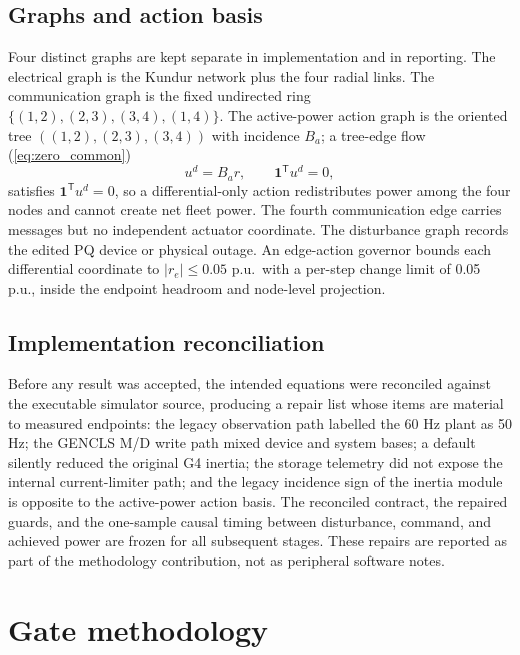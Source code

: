 \documentclass[journal]{IEEEtran}
\begin{document}
\subsection{Graphs and action basis}
\label{sec:graphs}

Four distinct graphs are kept separate in implementation and in reporting. The electrical graph is the Kundur network plus the four radial links. The communication graph is the fixed undirected ring $\{(1,2),(2,3),(3,4),(1,4)\}$. The active-power action graph is the oriented tree $((1,2),(2,3),(3,4))$ with incidence $B_a$; a tree-edge flow (\ref{eq:zero_common})
\begin{equation}
u^d = B_a r, \qquad \mathbf{1}^{\mathsf{T}} u^d = 0,
\label{eq:zero_common}
\end{equation}
satisfies $\mathbf{1}^{\mathsf{T}} u^d = 0$, so a differential-only action redistributes power among the four nodes and cannot create net fleet power. The fourth communication edge carries messages but no independent actuator coordinate. The disturbance graph records the edited PQ device or physical outage. An edge-action governor bounds each differential coordinate to $|r_e| \le 0.05$ p.u.\ with a per-step change limit of 0.05 p.u., inside the endpoint headroom and node-level projection.

\subsection{Implementation reconciliation}
\label{sec:plant-recon}

Before any result was accepted, the intended equations were reconciled against the executable simulator source, producing a repair list whose items are material to measured endpoints: the legacy observation path labelled the 60 Hz plant as 50 Hz; the GENCLS M/D write path mixed device and system bases; a default silently reduced the original G4 inertia; the storage telemetry did not expose the internal current-limiter path; and the legacy incidence sign of the inertia module is opposite to the active-power action basis. The reconciled contract, the repaired guards, and the one-sample causal timing between disturbance, command, and achieved power are frozen for all subsequent stages. These repairs are reported as part of the methodology contribution, not as peripheral software notes.

\section{Gate methodology}
\label{sec:gate-methodology}
\end{document}
